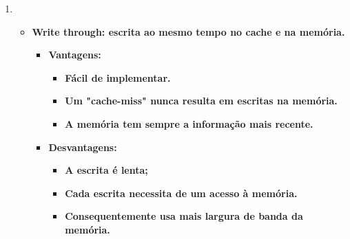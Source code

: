 \documentclass[12pt,a4paper]{article}
\begin{document}
\begin{titlepage}
\begin{enumerate}[1)]
	 \item 
	 \begin{itemize}
	 	\item
	 	\textbf{Write through: escrita ao mesmo tempo no cache e na memória.}
	 	\begin{itemize}
	 		\item 
	 		\textbf{Vantagens:}
	 		\begin{itemize}
	 			\item 
	 			\textbf{Fácil de implementar.}
	 			\item 
	 			\textbf{Um "cache-miss" nunca resulta em escritas na memória.}
	 			\item 
	 			\textbf{A memória tem sempre a informação mais recente.}
	 		\end{itemize}
 		\item
 		\textbf{Desvantagens:}
 		\begin{itemize}
 			\item 
 			\textbf{A escrita é lenta;}
 			\item 
 			\textbf{Cada escrita necessita de um acesso à memória.}
 			\item 
 			\textbf{Consequentemente usa mais largura de banda da memória.}
 		\end{itemize}
 	 	\end{itemize}
  	

\end{itemize}
\end{enumerate}
\end{titlepage}
\end{document}
